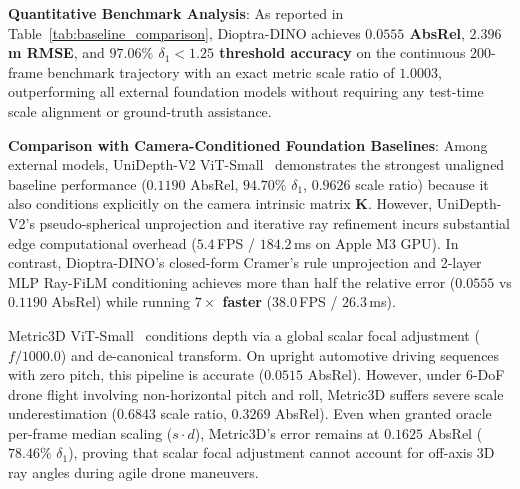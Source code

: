 \noindent\textbf{Quantitative Benchmark Analysis}: As reported in Table~\ref{tab:baseline_comparison}, Dioptra-DINO achieves \textbf{$0.0555$ AbsRel}, \textbf{$2.396$\,m RMSE}, and \textbf{$97.06\%$ $\delta_1 < 1.25$ threshold accuracy} on the continuous 200-frame benchmark trajectory with an exact metric scale ratio of \textbf{$1.0003$}, outperforming all external foundation models without requiring any test-time scale alignment or ground-truth assistance.

\noindent\textbf{Comparison with Camera-Conditioned Foundation Baselines}: 
Among external models, UniDepth-V2 ViT-Small~\cite{piccinelli2025unidepth2} demonstrates the strongest unaligned baseline performance ($0.1190$ AbsRel, $94.70\%$ $\delta_1$, $0.9626$ scale ratio) because it also conditions explicitly on the camera intrinsic matrix $\mathbf{K}$. However, UniDepth-V2's pseudo-spherical unprojection and iterative ray refinement incurs substantial edge computational overhead ($5.4$\,FPS / $184.2$\,ms on Apple M3 GPU). In contrast, Dioptra-DINO's closed-form Cramer's rule unprojection and 2-layer MLP Ray-FiLM conditioning achieves more than half the relative error ($0.0555$ vs $0.1190$ AbsRel) while running \textbf{$7\times$ faster} ($38.0$\,FPS / $26.3$\,ms).

Metric3D ViT-Small~\cite{yin2023metric3d} conditions depth via a global scalar focal adjustment ($f / 1000.0$) and de-canonical transform. On upright automotive driving sequences with zero pitch, this pipeline is accurate ($0.0515$ AbsRel). However, under 6-DoF drone flight involving non-horizontal pitch and roll, Metric3D suffers severe scale underestimation ($0.6843$ scale ratio, $0.3269$ AbsRel). Even when granted oracle per-frame median scaling ($s \cdot d$), Metric3D's error remains at $0.1625$ AbsRel ($78.46\%$ $\delta_1$), proving that scalar focal adjustment cannot account for off-axis 3D ray angles during agile drone maneuvers.


